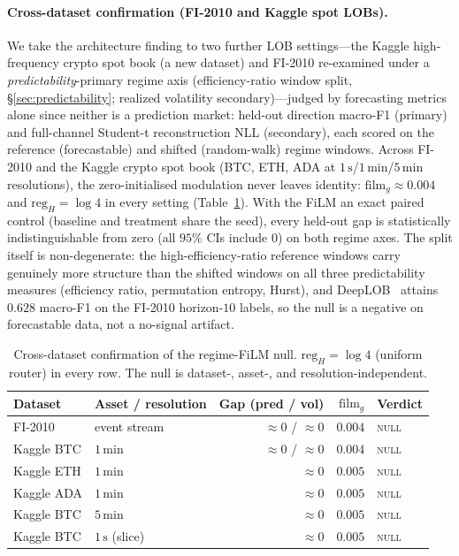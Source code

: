 \documentclass{article}
\begin{document}
\paragraph{Cross-dataset confirmation (FI-2010 and Kaggle spot LOBs).}
We take the architecture finding to two further LOB settings---the Kaggle
high-frequency crypto spot book (a new dataset) and FI-2010 re-examined under a
\emph{predictability}-primary regime axis (efficiency-ratio window split,
\S\ref{sec:predictability}; realized volatility secondary)---judged by forecasting
metrics alone since neither is a prediction market: held-out direction macro-F1
(primary) and full-channel Student-t reconstruction NLL (secondary), each scored on the
reference (forecastable) and shifted (random-walk) regime windows. Across FI-2010 and
the Kaggle crypto spot book (BTC, ETH, ADA at $1\,\mathrm{s}$/$1\,\mathrm{min}$/$5\,
\mathrm{min}$ resolutions), the zero-initialised modulation never leaves identity:
$\mathrm{film}_g \approx 0.004$ and $\mathrm{reg}_H = \log 4$ in every setting
(Table~\ref{tab:film_null_xdata}). With the FiLM an exact paired control (baseline and
treatment share the seed), every held-out gap is statistically indistinguishable from
zero (all $95\%$ CIs include $0$) on both regime axes. The split itself is non-degenerate:
the high-efficiency-ratio reference windows carry genuinely more structure than the
shifted windows on all three predictability measures (efficiency ratio, permutation
entropy, Hurst), and DeepLOB~\citep{zhang2019deeplob} attains $0.628$ macro-F1 on the FI-2010 horizon-$10$ labels,
so the null is a negative on forecastable data, not a no-signal artifact.

\begin{table}[t]
\centering
\small
\begin{tabular}{llrrl}
\toprule
Dataset & Asset / resolution & Gap (pred / vol) & $\mathrm{film}_g$ & Verdict \\
\midrule
FI-2010      & event stream          & $\approx 0$ / $\approx 0$ & $0.004$ & \textsc{null} \\
Kaggle BTC   & $1\,\mathrm{min}$      & $\approx 0$ / $\approx 0$ & $0.004$ & \textsc{null} \\
Kaggle ETH   & $1\,\mathrm{min}$      & $\approx 0$               & $0.005$ & \textsc{null} \\
Kaggle ADA   & $1\,\mathrm{min}$      & $\approx 0$               & $0.005$ & \textsc{null} \\
Kaggle BTC   & $5\,\mathrm{min}$      & $\approx 0$               & $0.005$ & \textsc{null} \\
Kaggle BTC   & $1\,\mathrm{s}$ (slice)& $\approx 0$               & $0.005$ & \textsc{null} \\
\bottomrule
\end{tabular}
\caption{Cross-dataset confirmation of the regime-FiLM null. $\mathrm{reg}_H = \log 4$
(uniform router) in every row. The null is dataset-, asset-, and resolution-independent.}
\label{tab:film_null_xdata}
\end{table}
\end{document}
